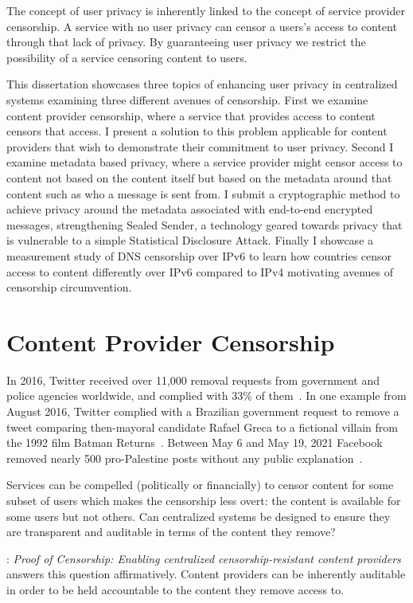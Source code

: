 The concept of user privacy is inherently linked to the concept of service
provider censorship. A service with no user privacy can censor a users's access
to content through that lack of privacy. By guaranteeing user privacy we
restrict the possibility of a service censoring content to users. 

This dissertation showcases three topics of enhancing user privacy in
centralized systems examining three different avenues of censorship. First we
examine content provider censorship, where a service that provides access to
content censors that access. I present a solution to this problem applicable for
content providers that wish to demonstrate their commitment to user privacy.
Second I examine metadata based privacy, where a service provider might censor
access to content not based on the content itself but based on the metadata
around that content such as who a message is sent from. I submit a cryptographic
method to achieve privacy around the metadata associated with end-to-end
encrypted messages, strengthening Sealed Sender, a technology geared towards
privacy that is vulnerable to a simple Statistical Disclosure Attack. Finally I
showcase a measurement study of DNS censorship over IPv6 to learn how countries
censor access to content differently over IPv6 compared to IPv4 motivating
avenues of censorship circumvention.

\section{Content Provider Censorship}
In 2016, Twitter received over 11,000 removal requests from government and
police agencies worldwide, and complied with 33\% of
them~\cite{twitter-transparency}. In one example from August 2016, Twitter
complied with a Brazilian government request to remove a tweet comparing
then-mayoral candidate Rafael Greca to a fictional villain from the 1992 film
Batman Returns~\cite{twitter-rafael-greca}. Between May 6 and May 19, 2021
Facebook removed nearly 500 pro-Palestine posts without any public
explanation~\cite{fb-palestine}.

Services can be compelled (politically or financially) to censor content for
some subset of users which makes the censorship less overt: the content is
available for some users but not others. Can centralized systems be designed to
ensure they are transparent and auditable in terms of the content they remove?

: \emph{Proof of Censorship: Enabling centralized
censorship-resistant content providers} answers this question affirmatively.
Content providers can be inherently auditable in order to be held accountable to
the content they remove access to.

